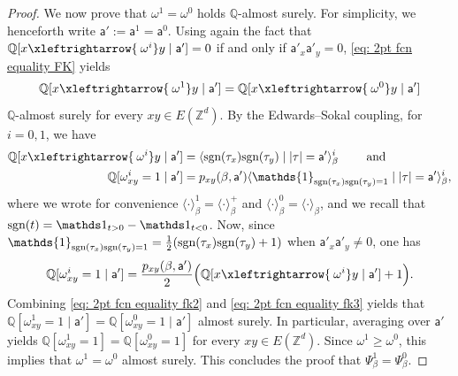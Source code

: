 \documentclass[11pt,a4paper]{article}
\numberwithin{equation}{section}
\theoremstyle{plain}
\theoremstyle{definition}
\newcommand{\connect}{\xleftrightarrow}
\begin{document}
\begin{proof}
We now prove that $\omega^1=\omega^0$ holds $\mathbb{Q}$-almost surely. 
For simplicity, we henceforth write $\mathsf{a}':=\mathsf{a}^1=\mathsf{a}^0$. 
Using again the fact that $\mathbb{Q}[ x\connect{\:\omega^i} y \mid \mathsf{a}']=0$ if and only if $\mathsf{a}'_x\mathsf{a}'_y=0$, \eqref{eq: 2pt fcn equality FK} yields
\begin{equation} \label{eq: 2pt fcn equality fk2}
    \mathbb{Q}[ x\connect{\:\omega^1} y \mid \mathsf{a}'] = \mathbb{Q}[ x\connect{\:\omega^0} y \mid \mathsf{a}']
\end{equation}
$\mathbb{Q}$-almost surely for every $xy\in E(\mathbb Z^d)$.
By the Edwards--Sokal coupling, for $i=0,1$, we have
\begin{align}
\mathbb{Q}[ x\connect{\:\omega^i} y \mid \mathsf{a}'] 
&=\langle \textup{sgn}(\tau_x) \textup{sgn}(\tau_y) \mid |\tau|=\mathsf a' \rangle^i_{\beta} ~~~~~~\text{  and  }  \\ 
\mathbb{Q}[ \omega^i_{xy}=1 \mid \mathsf{a}'] 
&= p_{xy}(\beta,\mathsf{a}') \langle \mathds{1}_{\textup{sgn}(\tau_x) \textup{sgn}(\tau_y)=1}\mid |\tau|=\mathsf a' \rangle^i_{\beta},
\end{align}
where we wrote for convenience $\langle \cdot \rangle^1_\beta = \langle \cdot \rangle^+_\beta$ and $\langle \cdot \rangle^0_\beta = \langle \cdot \rangle_\beta$, and we recall that $\textup{sgn}(t) = \mathds 1_{t> 0} - \mathds 1_{t<0}$. 
Now, since $\mathds{1}_{\textup{sgn}(\tau_x) \textup{sgn}(\tau_y)=1}=\tfrac{1}{2}(\textup{sgn}(\tau_x) \textup{sgn}(\tau_y)+1)$ when $\mathsf{a}'_x\mathsf{a}'_y\neq 0$, one has
\begin{equation} \label{eq: 2pt fcn equality fk3}
    \mathbb{Q}[ \omega^i_{xy}=1 \mid \mathsf{a}'] = \frac{p_{xy}(\beta,\mathsf{a}') }{2}\Big( \mathbb{Q}[ x\connect{\:\omega^i} y \mid \mathsf{a}']+ 1 \Big).
\end{equation}
Combining \eqref{eq: 2pt fcn equality fk2} and \eqref{eq: 2pt fcn equality fk3} yields that $\mathbb{Q}[ \omega^1_{xy}=1 \mid \mathsf{a}'] = \mathbb{Q}[ \omega^0_{xy}=1 \mid \mathsf{a}']$ almost surely. In particular, averaging over $\mathsf a'$ yields $\mathbb{Q}[ \omega^1_{xy}=1] = \mathbb{Q}[\omega^0_{xy}=1]$ for every $xy\in E(\mathbb Z^d)$. Since $\omega^1\geq\omega^0$, this implies that $\omega^1=\omega^0$ almost surely. This concludes the proof that $\Psi^1_\beta = \Psi^0_\beta$. 
\end{proof}
\end{document}
